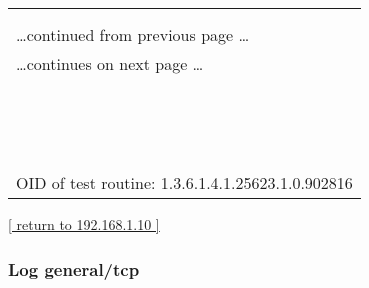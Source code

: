 \documentclass{article}
\begin{document}
\begin{longtable}{|p{}|}
\hline
\rowcolor{openvas_log}{\color{white}{Log (CVSS: 0.0) }}\\
\rowcolor{openvas_log}{\color{white}{NVT: Check for SSL Medium Ciphers}}\\
\hline
\endfirsthead
\hfill\ldots continued from previous page \ldots \\
\hline
\endhead
\hline
\ldots continues on next page \ldots \\
\endfoot
\hline
\endlastfoot
\\
\rowcolor{white}{\verb=Medium ciphers offered by this service:=}\\
\rowcolor{white}{\verb=  SSL3_RSA_DES_192_CBC3_SHA=}\\
\rowcolor{white}{\verb=  SSL3_EDH_RSA_DES_192_CBC3_SHA=}\\
\rowcolor{white}{\verb=  SSL3_ADH_DES_192_CBC_SHA=}\\
\rowcolor{white}{\verb=  SSL3_DHE_RSA_WITH_AES_128_SHA=}\\
\rowcolor{white}{\verb=  SSL3_ADH_WITH_AES_128_SHA=}\\
\rowcolor{white}{\verb=  TLS1_RSA_DES_192_CBC3_SHA=}\\
\rowcolor{white}{\verb=  TLS1_EDH_RSA_DES_192_CBC3_SHA=}\\
\rowcolor{white}{\verb=  TLS1_ADH_DES_192_CBC_SHA=}\\
\rowcolor{white}{\verb=  TLS1_DHE_RSA_WITH_AES_128_SHA=}\\
\rowcolor{white}{\verb=  TLS1_ADH_WITH_AES_128_SHA=}\\
\rowcolor{white}{\verb==}\\
\rowcolor{white}{\verb==}\\
\\
OID of test routine: 1.3.6.1.4.1.25623.1.0.902816\\
\end{longtable}

\begin{footnotesize}\hyperref[host:192.168.1.10]{[ return to 192.168.1.10 ]}\end{footnotesize}
\subsubsection{Log general/tcp}
\label{port:192.168.1.10 general/tcp Log}
\end{document}
